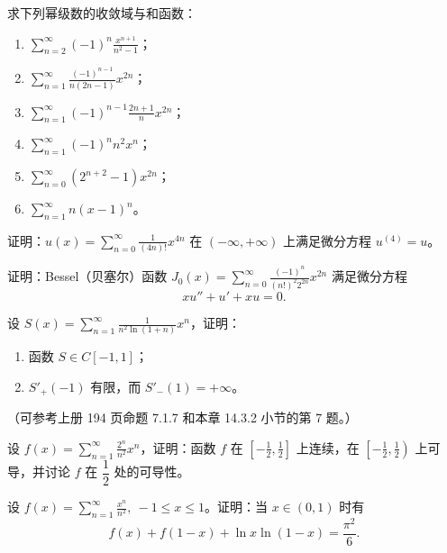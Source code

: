 \begin{xexercise}[6]
求下列幂级数的收敛域与和函数：
  \begin{enumerate}[label=(\arabic*)]
    \item $\displaystyle\sum_{n=2}^{\infty}(-1)^n\frac{x^{n+1}}{n^2-1}$；
    \item $\displaystyle\sum_{n=1}^{\infty}\frac{(-1)^{n-1}}{n(2n-1)}x^{2n}$；
    \item $\displaystyle\sum_{n=1}^{\infty}(-1)^{n-1}\frac{2n+1}{n}x^{2n}$；
    \item $\displaystyle\sum_{n=1}^{\infty}(-1)^nn^2x^n$；
    \item $\displaystyle\sum_{n=0}^{\infty}(2^{n+2}-1)x^{2n}$；
    \item $\displaystyle\sum_{n=1}^{\infty}n(x-1)^n$。
  \end{enumerate}
\end{xexercise}

\begin{xexercise}[7]
证明：$\displaystyle u(x)=\sum_{n=0}^{\infty}\frac1{(4n)!}x^{4n}$ 在 $(-\infty,+\infty)$ 上满足微分方程 $u^{(4)}=u$。
\end{xexercise}

\begin{xexercise}[8]
证明：Bessel（贝塞尔）函数 $\displaystyle J_0(x)=\sum_{n=0}^{\infty}\frac{(-1)^n}{(n!)^2 2^{2n}}x^{2n}$ 满足微分方程
  \[
    xu''+u'+xu=0.
  \]
\end{xexercise}

\begin{xexercise}[9]
设 $\displaystyle S(x)=\sum_{n=1}^{\infty}\frac1{n^2\ln(1+n)}x^n$，证明：
  \begin{enumerate}[label=(\arabic*)]
    \item 函数 $S\in C[-1,1]$；
    \item $S'_+(-1)$ 有限，而 $S'_-(1)=+\infty$。
  \end{enumerate}
  （可参考上册 194 页命题 7.1.7 和本章 14.3.2 小节的第 7 题。）
\end{xexercise}

\begin{xexercise}[10]
设 $\displaystyle f(x)=\sum_{n=1}^{\infty}\frac{2^n}{n^2}x^n$，证明：函数 $f$ 在 $\left[-\frac12,\frac12\right]$ 上连续，在 $\left[-\frac12,\frac12\right)$ 上可导，并讨论 $f$ 在 $\dfrac12$ 处的可导性。
\end{xexercise}

\begin{xexercise}[11]
设 $\displaystyle f(x)=\sum_{n=1}^{\infty}\frac{x^n}{n^2},\ -1\leqslant x\leqslant1$。证明：当 $x\in(0,1)$ 时有
  \[
    f(x)+f(1-x)+\ln x\ln(1-x)=\frac{\pi^2}{6}.
  \]
\end{xexercise}

